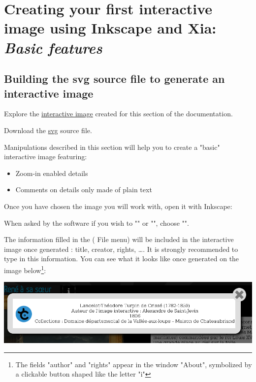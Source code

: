\section{Creating your first interactive image using Inkscape and Xia: \emph{Basic features}}\label{basic_imageactive}

\subsection{Building the svg source file to generate an interactive image}\label{preparation_svg}

\begin{links}
Explore the \href{http://xia.dane.ac-versailles.fr/demo/tuto/xia1}{interactive image} created for this section of the documentation.

Download the \href{http://xia.dane.ac-versailles.fr/demo/tuto/xia1/svg/xia1.svg}{svg} source file.
\end{links}

Manipulations described in this section will help you to
create a "basic" interactive image featuring:
\begin{itemize}
 \item Zoom-in enabled details
 \item Comments on details only made of plain text
\end{itemize}


Once you have chosen the image you will work with, open it with Inkscape:


When asked by the software if you wish to "" or "", choose "".

The information filled in the  (\softmenu
{File} menu) will be included in the interactive image once
generated : title, creator, rights, \ldots. It is strongly recommended to type in this information.
You can see what it looks like once generated on the image below\footnote{The
fields "author" and "rights" appear in the window
"About", symbolized by a clickable button shaped like the letter "i"}:\\

\begin{center}
 \includegraphics[width=\textwidth]{images/ia_title}\\
\end{center}

